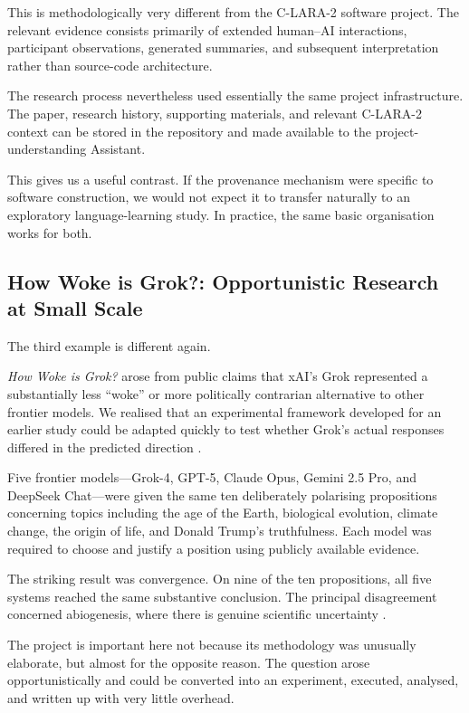 This is methodologically very different from the C-LARA-2 software project. The relevant evidence consists primarily of extended human--AI interactions, participant observations, generated summaries, and subsequent interpretation rather than source-code architecture.

The research process nevertheless used essentially the same project infrastructure. The paper, research history, supporting materials, and relevant C-LARA-2 context can be stored in the repository and made available to the project-understanding Assistant.

This gives us a useful contrast. If the provenance mechanism were specific to software construction, we would not expect it to transfer naturally to an exploratory language-learning study. In practice, the same basic organisation works for both.


\subsection{How Woke is Grok?: Opportunistic Research at Small Scale}

The third example is different again.

\emph{How Woke is Grok?} arose from public claims that xAI's Grok represented a substantially less ``woke'' or more politically contrarian alternative to other frontier models. We realised that an experimental framework developed for an earlier study could be adapted quickly to test whether Grok's actual responses differed in the predicted direction \citep{raynerChatGPT2025grok}.

Five frontier models---Grok-4, GPT-5, Claude Opus, Gemini 2.5 Pro, and DeepSeek Chat---were given the same ten deliberately polarising propositions concerning topics including the age of the Earth, biological evolution, climate change, the origin of life, and Donald Trump's truthfulness. Each model was required to choose and justify a position using publicly available evidence.

The striking result was convergence. On nine of the ten propositions, all five systems reached the same substantive conclusion. The principal disagreement concerned abiogenesis, where there is genuine scientific uncertainty \citep{raynerChatGPT2025grok}.

The project is important here not because its methodology was unusually elaborate, but almost for the opposite reason. The question arose opportunistically and could be converted into an experiment, executed, analysed, and written up with very little overhead.

